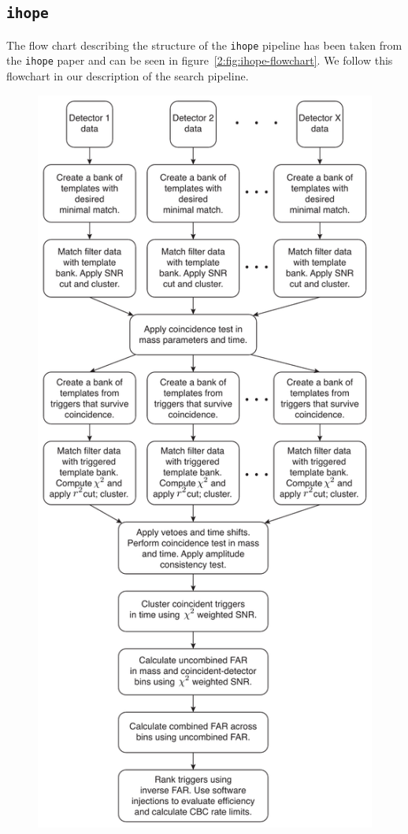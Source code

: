 \subsection{\label{2:sec:searching-for-gw-with-ihope}\texttt{ihope}}
The flow chart describing the structure of the \verb|ihope| pipeline has been taken from the \verb|ihope| paper and can be seen in figure~\ref{2:fig:ihope-flowchart}. We follow this flowchart in our description of the search pipeline.
%
\begin{figure}
    \centering
    \includegraphics[width=1.0\linewidth]{images/2_searches/ihope_flowchart.pdf}

\end{figure}
